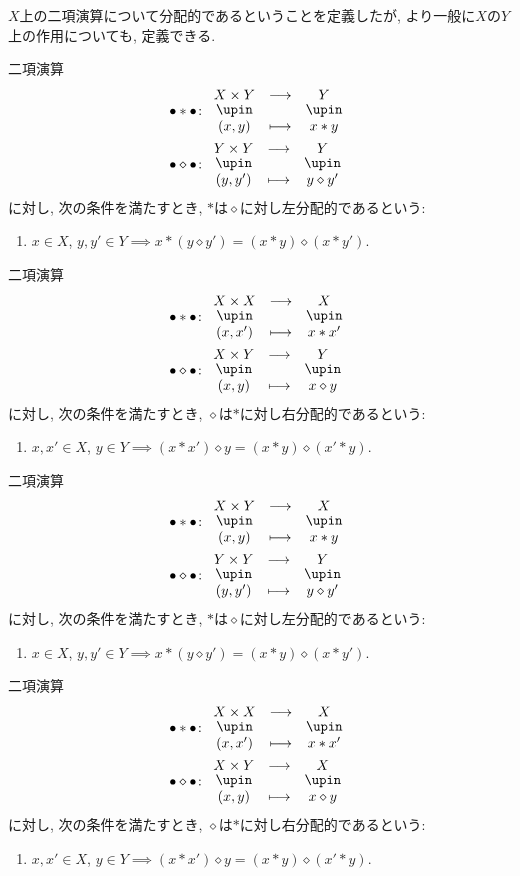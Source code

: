 $X$上の二項演算について分配的であるということを定義したが,
より一般に$X$の$Y$上の作用についても, 定義できる.
\begin{definition}
  二項演算
  \begin{align*}
    \tofu \ast \tofu &\colon
    \Shazo{X\times Y}{Y}{(x,y)}{x\ast y}\\
    \tofu \diamond \tofu &\colon
    \Shazo{Y\times Y}{Y}{(y,y')}{y\diamond y'}
  \end{align*}
  に対し,
  次の条件を満たすとき,
  $\ast$は$\diamond$に対し左分配的であるという:
  \begin{enumerate}
  \item $x\in X$, $y,y'\in Y \implies x\ast (y\diamond y')=(x\ast y)\diamond (x\ast y')$.
  \end{enumerate}
\end{definition}
\begin{definition}
  二項演算
  \begin{align*}
    \tofu \ast \tofu &\colon
    \Shazo{X\times X}{X}{(x,x')}{x\ast x'}\\
    \tofu \diamond \tofu &\colon
    \Shazo{X\times Y}{Y}{(x,y)}{x\diamond y}
  \end{align*}
  に対し,
  次の条件を満たすとき,
  $\diamond$は$\ast$に対し右分配的であるという:
  \begin{enumerate}
  \item $x,x'\in X$, $y\in Y \implies (x\ast x')\diamond y=(x\ast y)\diamond (x'\ast y)$.
  \end{enumerate}
\end{definition}
\begin{definition}
  二項演算
  \begin{align*}
    \tofu \ast \tofu &\colon
    \Shazo{X\times Y}{X}{(x,y)}{x\ast y}\\
    \tofu \diamond \tofu &\colon
    \Shazo{Y\times Y}{Y}{(y,y')}{y\diamond y'}
  \end{align*}
  に対し,
  次の条件を満たすとき,
  $\ast$は$\diamond$に対し左分配的であるという:
  \begin{enumerate}
  \item $x\in X$, $y,y'\in Y \implies x\ast (y\diamond y')=(x\ast y)\diamond (x\ast y')$.
  \end{enumerate}
\end{definition}
\begin{definition}
  二項演算
  \begin{align*}
    \tofu \ast \tofu &\colon
    \Shazo{X\times X}{X}{(x,x')}{x\ast x'}\\
    \tofu \diamond \tofu &\colon
    \Shazo{X\times Y}{X}{(x,y)}{x\diamond y}
  \end{align*}
  に対し,
  次の条件を満たすとき,
  $\diamond$は$\ast$に対し右分配的であるという:
  \begin{enumerate}
  \item $x,x'\in X$, $y\in Y \implies (x\ast x')\diamond y=(x\ast y)\diamond (x'\ast y)$.
  \end{enumerate}
\end{definition}



